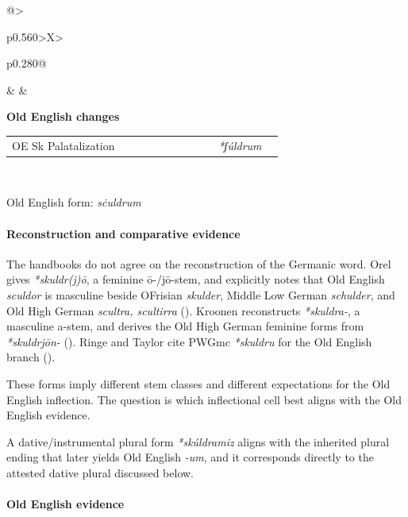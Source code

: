 \documentclass[
  british,
  a4paper,
]{article}
\begin{document}
{\begin{minipage}{0.97\linewidth}
\begin{tabularx}{\linewidth}{@{}>{\raggedright\arraybackslash}p{0.560\linewidth}>{\centering\arraybackslash}X>{\raggedright\arraybackslash}p{0.280\linewidth}@{}}
\begin{minipage}[t]{\linewidth}
\end{minipage}
&
&
\begin{minipage}[t]{\linewidth}
\centering\textbf{Old English changes}\par
\vspace{0.35em}
\raggedright
\begin{tabular}{@{}>{\raggedright\arraybackslash}p{0.64\linewidth}@{\hspace{0.55em}}>{\raggedright\arraybackslash}p{0.20\linewidth}@{\hspace{0.25em}}}
OE Sk Palatalization & \emph{*ʃúldrum} \\
\end{tabular}
\end{minipage}
\\
\end{tabularx}
\end{minipage}%
} \endgroup

Old English form: \emph{sċuldrum}

\paragraph{Reconstruction and comparative
evidence}\label{reconstruction-and-comparative-evidence-53}

The handbooks do not agree on the reconstruction of the Germanic word.
Orel gives \emph{*skuldr(j)ō}, a feminine ō-/jō-stem, and explicitly
notes that Old English \emph{sculdor} is masculine beside OFrisian
\emph{skulder}, Middle Low German \emph{schulder}, and Old High German
\emph{scultra, scultirra} ().
Kroonen reconstructs \emph{*skuldra-}, a masculine a-stem, and derives
the Old High German feminine forms from \emph{*skuldrjōn-}
(). Ringe and Taylor cite
PWGmc \emph{*skuldru} for the Old English branch
().

These forms imply different stem classes and different expectations for
the Old English inflection. The question is which inflectional cell best
aligns with the Old English evidence.

A dative/instrumental plural form \emph{*skúldramiz} aligns with the
inherited plural ending that later yields Old English \emph{-um}, and it
corresponds directly to the attested dative plural discussed below.

\paragraph{Old English evidence}\label{old-english-evidence-53}
\end{document}
